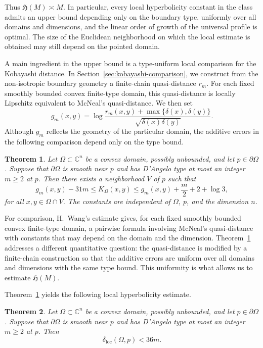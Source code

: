 \documentclass[11pt]{article}
\newtheorem{theorem}{Theorem}[section]
\theoremstyle{definition}
\newcommand{\C}{\mathbb{C}}
\begin{document}
Thus \(\mathfrak H(M)\asymp M\). In particular, every local
hyperbolicity constant in the class admits an upper bound depending only on
the boundary type, uniformly over all domains and dimensions, and the linear
order of growth of the universal profile is optimal.   The size of the Euclidean neighborhood on which the local
estimate is obtained may still depend on the pointed domain.

A main ingredient in the upper bound is a type-uniform local comparison
for the Kobayashi distance.  In
Section~\ref{sec:kobayashi-comparison}, we construct from the
non-isotropic boundary geometry a finite-chain quasi-distance \(r_m\).
For each fixed smoothly bounded convex finite-type domain, this
quasi-distance is locally Lipschitz equivalent to McNeal's
quasi-distance.  We then set
\[
g_m(x,y)
=
\log
\frac{
	r_m(x,y)+\max\{\delta(x),\delta(y)\}
}{
	\sqrt{\delta(x)\delta(y)}
}.
\]
Although \(g_m\) reflects the geometry of the particular domain, the
additive errors in the following comparison depend only on the type
bound.

\begin{theorem}
	\label{thm:two-sided-kobayashi}
	Let \(\Omega\subset\C^n\) be a convex domain, possibly unbounded, and
	let \(p\in\partial\Omega\).  Suppose that \(\partial\Omega\) is smooth
	near \(p\) and has D'Angelo type at most an integer \(m\ge2\)
	at \(p\).  Then there exists a neighborhood
	\(V\) of \(p\) such that
	\begin{equation*}
		g_m(x,y)-31m
		\le
		K_\Omega(x,y)
		\le
		g_m(x,y)+\frac m2+2+\log3,
	\end{equation*}
	for all \(x,y\in\Omega\cap V\).
	The constants are independent of \(\Omega\), \(p\), and the dimension
	\(n\).
\end{theorem}

For comparison, H.~Wang's estimate \cite{WangJLMS} gives, for each fixed
smoothly bounded convex finite-type domain, a pairwise formula involving
McNeal's quasi-distance with constants that may depend on the domain and the dimension.
Theorem~\ref{thm:two-sided-kobayashi} addresses a different quantitative
question: the quasi-distance is modified by a finite-chain construction
so that the additive errors are uniform over all domains and dimensions
with the same type bound.  This uniformity is what allows us to estimate
\(\mathfrak H(M)\).

Theorem~\ref{thm:two-sided-kobayashi} yields the following local
hyperbolicity estimate.

\begin{theorem}
	\label{thm:main}
	Let \(\Omega\subset\C^n\) be a convex domain, possibly unbounded, and
	let \(p\in\partial\Omega\).  Suppose that \(\partial\Omega\) is smooth
	near \(p\) and has D'Angelo type at most an integer \(m\ge2\)
	at \(p\).  Then
	\[
	\delta_{\mathrm{loc}}(\Omega,p)<36m.
	\]
\end{theorem}
\end{document}

